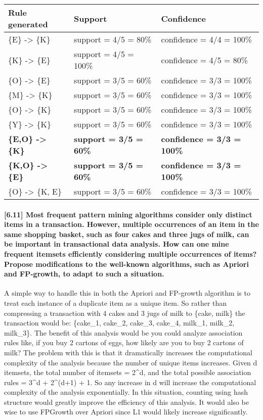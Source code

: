 \documentclass[11pt]{article}
\begin{document}
    \begin{longtable}[]{@{}lll@{}}
\toprule
Rule generated & Support & Confidence\tabularnewline
\midrule
\endhead
\{E\} -\textgreater{} \{K\} & support = 4/5 = 80\% & confidence = 4/4 =
100\%\tabularnewline
\{K\} -\textgreater{} \{E\} & support = 4/5 = 100\% & confidence = 4/5 =
80\%\tabularnewline
\{O\} -\textgreater{} \{E\} & support = 3/5 = 60\% & confidence = 3/3 =
100\%\tabularnewline
\{M\} -\textgreater{} \{K\} & support = 3/5 = 60\% & confidence = 3/3 =
100\%\tabularnewline
\{O\} -\textgreater{} \{K\} & support = 3/5 = 60\% & confidence = 3/3 =
100\%\tabularnewline
\{Y\} -\textgreater{} \{K\} & support = 3/5 = 60\% & confidence = 3/3 =
100\%\tabularnewline
\textbf{\{E,O\} -\textgreater{} \{K\}} & \textbf{support = 3/5 = 60\%} &
\textbf{confidence = 3/3 = 100\%}\tabularnewline
\textbf{\{K,O\} -\textgreater{} \{E\}} & \textbf{support = 3/5 = 60\%} &
\textbf{confidence = 3/3 = 100\%}\tabularnewline
\{O\} -\textgreater{} \{K, E\} & support = 3/5 = 60\% & confidence = 3/3
= 100\%\tabularnewline
\bottomrule
\end{longtable}

    \paragraph{{[}6.11{]} Most frequent pattern mining algorithms consider
only distinct items in a transaction. However, multiple occurrences of
an item in the same shopping basket, such as four cakes and three jugs
of milk, can be important in transactional data analysis. How can one
mine frequent itemsets efficiently considering multiple occurrences of
items? Propose modifications to the well-known algorithms, such as
Apriori and FP-growth, to adapt to such a
situation.}\label{most-frequent-pattern-mining-algorithms-consider-only-distinct-items-in-a-transaction.-however-multiple-occurrences-of-an-item-in-the-same-shopping-basket-such-as-four-cakes-and-three-jugs-of-milk-can-be-important-in-transactional-data-analysis.-how-can-one-mine-frequent-itemsets-efficiently-considering-multiple-occurrences-of-items-propose-modifications-to-the-well-known-algorithms-such-as-apriori-and-fp-growth-to-adapt-to-such-a-situation.}

    A simple way to handle this in both the Apriori and FP-growth algorithm
is to treat each instance of a duplicate item as a unique item. So
rather than compressing a transaction with 4 cakes and 3 jugs of milk to
\{cake, milk\} the transaction would be: \{cake\_1, cake\_2, cake\_3,
cake\_4, milk\_1, milk\_2, milk\_3\}. The benefit of this analysis would
be you could analyze association rules like, if you buy 2 cartons of
eggs, how likely are you to buy 2 cartons of milk? The problem with this
is that it dramatically increases the computational complexity of the
analysis because the number of unique items increases. Given d itemsets,
the total number of itemsets = 2\^{}d, and the total possible
association rules = 3\^{}d + 2\^{}(d+1) + 1. So any increase in d will
increase the computational complexity of the analysis exponentially. In
this situation, counting using hash structure would greatly improve the
efficiency of this analysis. It would also be wise to use FPGrowth over
Apriori since L1 would likely increase significantly.


    
    
    
    
\end{document}
